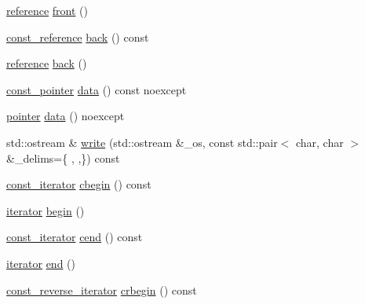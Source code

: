 \begin{DoxyCompactItemize}
\item 
\hyperlink{classcrsc_1_1dynamic__r3__tensor_a1a4d3cf01c93ee5b24b927236b1fd4b1}{reference} \hyperlink{classcrsc_1_1dynamic__r3__tensor_a00ef9ebe195ab7a3ba7fb872cc480549}{front} ()
\item 
\hyperlink{classcrsc_1_1dynamic__r3__tensor_a5dd99c21cd4dc396a2ae225f90301cdc}{const\+\_\+reference} \hyperlink{classcrsc_1_1dynamic__r3__tensor_a1bb7b213e995135bac9adc66dcf940e0}{back} () const 
\item 
\hyperlink{classcrsc_1_1dynamic__r3__tensor_a1a4d3cf01c93ee5b24b927236b1fd4b1}{reference} \hyperlink{classcrsc_1_1dynamic__r3__tensor_ae06f0f9bb86671a2f9d71b86cca8e526}{back} ()
\item 
\hyperlink{classcrsc_1_1dynamic__r3__tensor_afb88e84aba287b3b787b6d031c2c862e}{const\+\_\+pointer} \hyperlink{classcrsc_1_1dynamic__r3__tensor_aa246fb91fd628deaaecba221a650664a}{data} () const  noexcept
\item 
\hyperlink{classcrsc_1_1dynamic__r3__tensor_af0ce0fb7d1d534ab625b1cdc8ae56b8a}{pointer} \hyperlink{classcrsc_1_1dynamic__r3__tensor_a1d8eaba725b1a6f852ee0b1e5933b18e}{data} () noexcept
\item 
std\+::ostream \& \hyperlink{classcrsc_1_1dynamic__r3__tensor_a8c1747fe449761bb55aff816dbc70caa}{write} (std\+::ostream \&\+\_\+os, const std\+::pair$<$ char, char $>$ \&\+\_\+delims=\{ \textquotesingle{} \textquotesingle{}, \textquotesingle{},\textquotesingle{}\}) const 
\item 
\hyperlink{classcrsc_1_1dynamic__r3__tensor_a8e4bf09063232b58e5ae3b1a135fdff5}{const\+\_\+iterator} \hyperlink{classcrsc_1_1dynamic__r3__tensor_a336b686b93032e2469d735c60e0b637d}{cbegin} () const 
\item 
\hyperlink{classcrsc_1_1dynamic__r3__tensor_a8da8f1c3ec1cde63d7693e41c9e7f496}{iterator} \hyperlink{classcrsc_1_1dynamic__r3__tensor_ac45e6c898786f120d973fe177c7b92e9}{begin} ()
\item 
\hyperlink{classcrsc_1_1dynamic__r3__tensor_a8e4bf09063232b58e5ae3b1a135fdff5}{const\+\_\+iterator} \hyperlink{classcrsc_1_1dynamic__r3__tensor_a8179141276884ed51c3ee154826004b7}{cend} () const 
\item 
\hyperlink{classcrsc_1_1dynamic__r3__tensor_a8da8f1c3ec1cde63d7693e41c9e7f496}{iterator} \hyperlink{classcrsc_1_1dynamic__r3__tensor_a227558917e3d892df86f5b9ab32f52b0}{end} ()
\item 
\hyperlink{classcrsc_1_1dynamic__r3__tensor_afed2f011951ec314926ef9368aae848a}{const\+\_\+reverse\+\_\+iterator} \hyperlink{classcrsc_1_1dynamic__r3__tensor_af2d4afec82e92c0e96e74f33beef215f}{crbegin} () const 

\end{DoxyCompactItemize}
